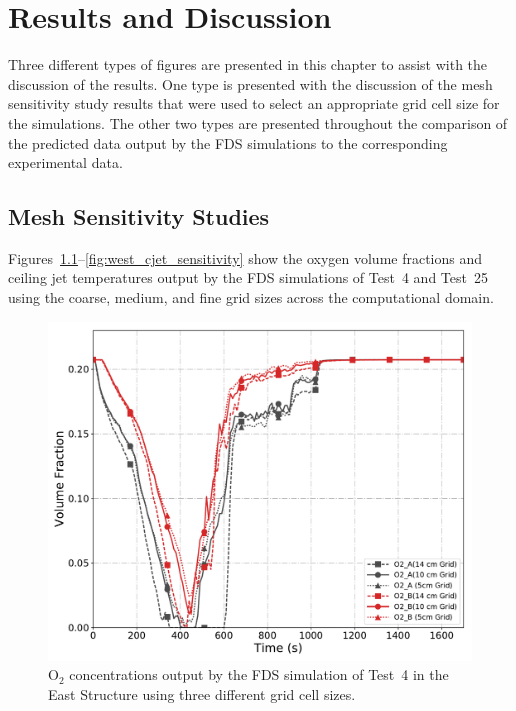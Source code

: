 \renewcommand{\thechapter}{5}

\chapter{Results and Discussion}
\label{chap:results_disc}
Three different types of figures are presented in this chapter to assist with the discussion of the results. One type is presented with the discussion of the mesh sensitivity study results that were used to select an appropriate grid cell size for the simulations. The other two types are presented throughout the comparison of the predicted data output by the FDS simulations to the corresponding experimental data. 

\section{Mesh Sensitivity Studies}
\label{sec:mesh_studies}
Figures~\ref{fig:east_O2_sensitivity}--\ref{fig:west_cjet_sensitivity} show the oxygen volume fractions and ceiling jet temperatures output by the FDS simulations of Test~4 and Test~25 using the coarse, medium, and fine grid sizes across the computational domain.
\begin{figure}[!h]
	\centering
	\includegraphics[width=\columnwidth]{Figures/Plots/Grid_Sensitivity/Gas_Concentration/Test_04_O2}
	\caption[O$_2$ concentrations for East Structure simulation with different grid cell sizes.]{O$_2$ concentrations output by the FDS simulation of Test~4 in the East Structure using three different grid cell sizes.}
	\label{fig:east_O2_sensitivity}
\end{figure}

